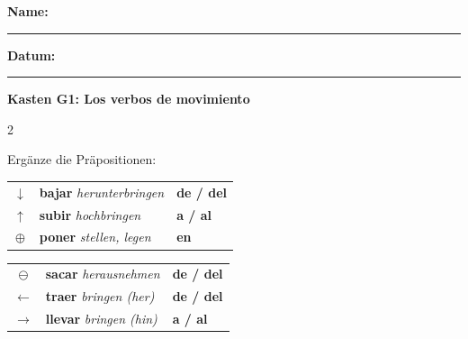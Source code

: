 \documentclass[10pt, a4paper]{article}
\newcommand{\sanstext}[1]{{\fontfamily{phv}\selectfont #1}}
\newcommand{\thema}{Mi nueva casa}
\newcommand{\klasse}{9}
\newcommand{\es}[1]{\textbf{#1}}
\newcommand{\de}[1]{{\small\textit{\textcolor{mittelgrau}{#1}}}}
\newcommand{\luecke}[1]{\rule{#1}{0.4pt}}
\newcommand{\lsg}[1]{\textcolor{loesung}{\textbf{#1}}}
\begin{document}

\noindent
{}

\vspace{0.5cm}

\noindent
\sanstext{\small\textbf{Name:}} \luecke{5cm} \hfill
\sanstext{\small\textbf{Datum:}} \luecke{2.5cm}

\vspace{6pt}


\begin{grammatikbox}
\sanstext{\footnotesize\textbf{Kasten G1: Los verbos de movimiento}}

\vspace{4pt}

\begin{multicols}{2}

{\small Ergänze die Präpositionen:}

\vspace{3pt}

{\footnotesize
\begin{tabular}{@{}cll@{}}
$\downarrow$ & \es{bajar} \de{herunterbringen} & \lsg{de / del} \\[0.5em]
$\uparrow$ & \es{subir} \de{hochbringen} & \lsg{a / al} \\[0.5em]
$\oplus$ & \es{poner} \de{stellen, legen} & \lsg{en} \\
\end{tabular}}

\columnbreak

{\footnotesize
\begin{tabular}{@{}cll@{}}
$\ominus$ & \es{sacar} \de{herausnehmen} & \lsg{de / del} \\[0.5em]
$\leftarrow$ & \es{traer} \de{bringen (her)} & \lsg{de / del} \\[0.5em]
$\rightarrow$ & \es{llevar} \de{bringen (hin)} & \lsg{a / al} \\
\end{tabular}}

\end{multicols}

\end{grammatikbox}
\end{document}
